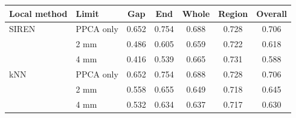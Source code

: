 \begin{tabular}{llccccc}
\toprule
Local method & Limit & Gap & End & Whole & Region & Overall \\
\midrule
SIREN & PPCA only & 0.652 & 0.754 & 0.688 & 0.728 & 0.706 \\
 & 2 mm & 0.486 & 0.605 & 0.659 & 0.722 & 0.618 \\
 & 4 mm & 0.416 & 0.539 & 0.665 & 0.731 & 0.588 \\
kNN & PPCA only & 0.652 & 0.754 & 0.688 & 0.728 & 0.706 \\
 & 2 mm & 0.558 & 0.655 & 0.649 & 0.718 & 0.645 \\
 & 4 mm & 0.532 & 0.634 & 0.637 & 0.717 & 0.630 \\
\bottomrule
\end{tabular}

